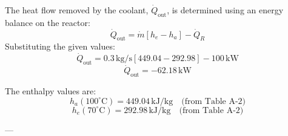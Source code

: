 The heat flow removed by the coolant, \( \dot{Q}_{\text{out}} \), is determined using an energy balance on the reactor:  
\[
\dot{Q}_{\text{out}} = \dot{m} \left[ h_e - h_a \right] - \dot{Q}_R
\]  
Substituting the given values:  
\[
\dot{Q}_{\text{out}} = 0.3 \, \text{kg/s} \left[ 449.04 - 292.98 \right] - 100 \, \text{kW}
\]  
\[
\dot{Q}_{\text{out}} = -62.18 \, \text{kW}
\]  

The enthalpy values are:  
\[
h_a (100^\circ\text{C}) = 449.04 \, \text{kJ/kg} \quad \text{(from Table A-2)}
\]  
\[
h_e (70^\circ\text{C}) = 292.98 \, \text{kJ/kg} \quad \text{(from Table A-2)}
\]  

---